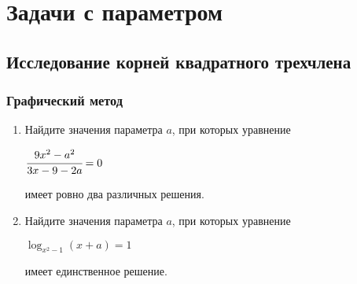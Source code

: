\documentclass[12pt]{article}
\begin{document}





\newpage
\section{Задачи с параметром}
\subsection{Исследование корней квадратного трехчлена}
\subsubsection*{Графический метод}
 \begin{enumerate}[start=1,label={\itshape\bfseries \arabic*.}]
    \item Найдите значения параметра $a$, при которых уравнение \begin{center} $\cfrac{9x^2 - a^2}{3x - 9 - 2a} = 0$ \end{center} имеет ровно два различных решения.
    \item Найдите значения параметра $a$, при которых уравнение \begin{center} $\log_{x^2 - 1}{(x + a)} = 1$ \end{center} имеет единственное решение.
\end{enumerate}
\end{document}
